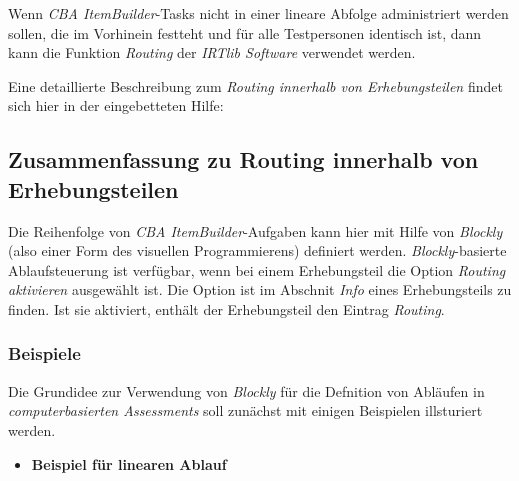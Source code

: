 \documentclass[
  letterpaper,
  DIV=11]{scrreprt}
\providecommand{\tightlist}{%
  \setlength{\itemsep}{0pt}\setlength{\parskip}{0pt}}\usepackage{longtable,booktabs,array}
\begin{document}
Wenn \emph{CBA ItemBuilder}-Tasks nicht in einer lineare Abfolge
administriert werden sollen, die im Vorhinein festteht und für alle
Testpersonen identisch ist, dann kann die Funktion \emph{Routing} der
\emph{IRTlib Software} verwendet werden.

Eine detaillierte Beschreibung zum \emph{Routing innerhalb von
Erhebungsteilen} findet sich hier in der eingebetteten Hilfe:

\begin{tcolorbox}[enhanced jigsaw, colbacktitle=quarto-callout-tip-color!10!white, coltitle=black, colframe=quarto-callout-tip-color-frame, leftrule=.75mm, breakable, opacitybacktitle=0.6, toprule=.15mm, title=\textcolor{quarto-callout-tip-color}{\faLightbulb}\hspace{0.5em}{Eingebettete Programmhilfe}, colback=white, titlerule=0mm, arc=.35mm, bottomtitle=1mm, toptitle=1mm, rightrule=.15mm, bottomrule=.15mm, left=2mm, opacityback=0]

\hypertarget{zusammenfassung-zu-routing-innerhalb-von-erhebungsteilen-1}{%
\subsection{Zusammenfassung zu Routing innerhalb von
Erhebungsteilen}\label{zusammenfassung-zu-routing-innerhalb-von-erhebungsteilen-1}}

Die Reihenfolge von \emph{CBA ItemBuilder}-Aufgaben kann hier mit Hilfe
von \emph{Blockly} (also einer Form des visuellen Programmierens)
definiert werden. \emph{Blockly}-basierte Ablaufsteuerung ist verfügbar,
wenn bei einem Erhebungsteil die Option \emph{Routing aktivieren}
ausgewählt ist. Die Option ist im Abschnit \emph{Info} eines
Erhebungsteils zu finden. Ist sie aktiviert, enthält der Erhebungsteil
den Eintrag \emph{Routing}.

\hypertarget{beispiele-1}{%
\subsubsection{Beispiele}\label{beispiele-1}}

Die Grundidee zur Verwendung von \emph{Blockly} für die Defnition von
Abläufen in \emph{computerbasierten Assessments} soll zunächst mit
einigen Beispielen illsturiert werden.

\begin{itemize}
\tightlist
\item
  \textbf{Beispiel für linearen Ablauf}
\end{itemize}


\end{tcolorbox}
\end{document}
